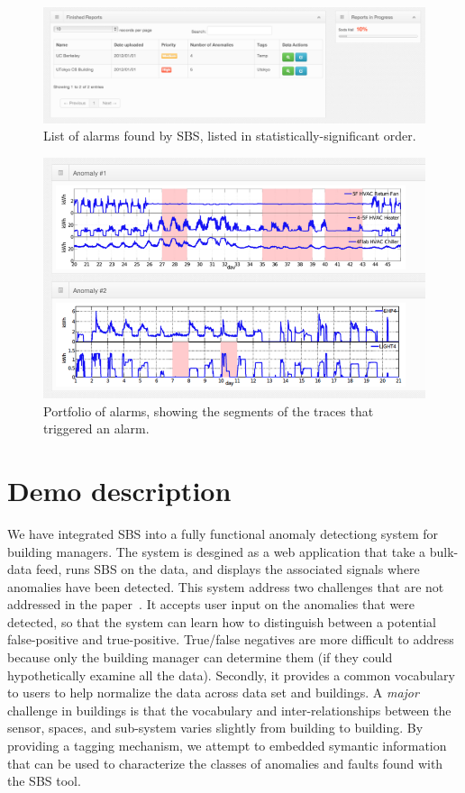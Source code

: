 
\begin{figure}[t!]
 \includegraphics[width=.5\textwidth]{img/eh_alarmlist.png}
 \caption{List of alarms found by SBS, listed in statistically-significant order.}
 \label{fig:ehalarmlist}
\end{figure}

\begin{figure}[t!]
 \includegraphics[width=.5\textwidth]{img/eh_screenshot1.png}
 \caption{Portfolio of alarms, showing the segments of the traces that triggered an alarm.}
 \label{fig:ehgraphs}
\end{figure}


\section{Demo description}
\label{sec:demo}
We have integrated SBS into a fully functional anomaly detectiong system for building managers.  The system 
is desgined as a web application that take a bulk-data feed, runs SBS on the data, and displays the associated 
signals where anomalies have been detected.  This system address two challenges that are not addressed in the 
paper~\cite{sbs:ipsn2013}.  It accepts user input on the anomalies that were detected, so that the system can learn
how to distinguish between a potential false-positive and true-positive.  True/false negatives are more difficult
to address because only the building manager can determine them (if they could hypothetically examine all the data).
Secondly, it provides a common vocabulary
to users to help normalize the data across data set and buildings.  A \emph{major} challenge in buildings 
is that the vocabulary and inter-relationships between the sensor, spaces, and sub-system varies slightly
from building to building.  By providing a tagging mechanism, we attempt to embedded symantic information
that can be used to characterize the classes of anomalies and faults found with the SBS tool.